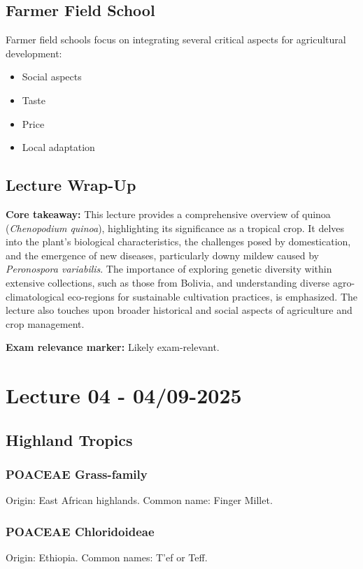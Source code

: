 \subsection{Farmer Field School} 
Farmer field schools focus on integrating several critical aspects for agricultural development: 
\begin{itemize} 
    \item Social aspects 
    \item Taste 
    \item Price 
    \item Local adaptation 
\end{itemize}


\subsection*{Lecture Wrap-Up} \textbf{Core takeaway:} 
This lecture provides a comprehensive overview of quinoa (\textit{Chenopodium quinoa}), highlighting its significance as a tropical crop. It delves into the plant's biological characteristics, the challenges posed by domestication, and the emergence of new diseases, particularly downy mildew caused by \textit{Peronospora variabilis}. The importance of exploring genetic diversity within extensive collections, such as those from Bolivia, and understanding diverse agro-climatological eco-regions for sustainable cultivation practices, is emphasized. The lecture also touches upon broader historical and social aspects of agriculture and crop management. 

\vspace{1em} 
\textbf{Exam relevance marker:} Likely exam-relevant.

\section{Lecture 04 - 04/09-2025}

\subsection{Highland Tropics} 
\subsubsection*{POACEAE Grass-family} 
Origin: East African highlands. Common name: Finger Millet.

\subsubsection*{POACEAE Chloridoideae} 
Origin: Ethiopia. Common names: T'ef or Teff.

